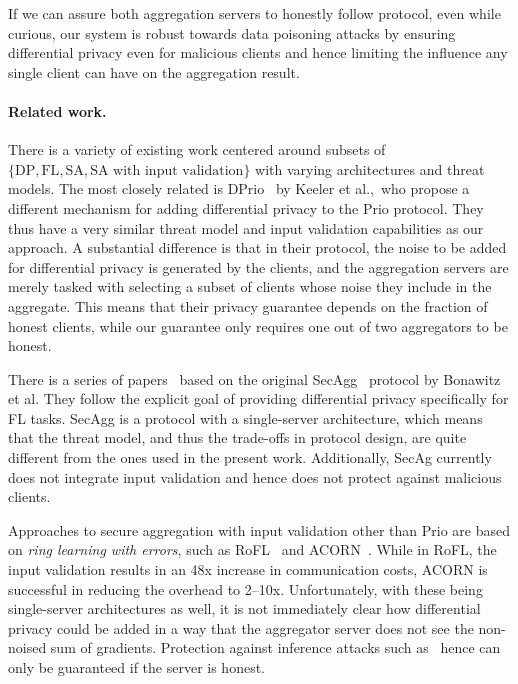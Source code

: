 \documentclass{article}
\begin{document}
If we can assure both aggregation servers to honestly follow protocol, even while curious, our system is robust towards data poisoning attacks by ensuring differential privacy even for malicious clients and hence limiting the influence any single client can have on the aggregation result.

\paragraph{Related work.}
There is a variety of existing work centered around subsets of
$\{\textrm{DP}, \textrm{FL}, \textrm{SA}, \textrm{SA with input validation}\}$ with varying
architectures and threat models. The most closely related is
DPrio~\cite{dprio} by Keeler et al.,\ who propose a different mechanism for
adding differential privacy to the Prio protocol. They thus have a very similar
threat model and input validation capabilities as our approach. A substantial
difference is that in their protocol, the noise to be added for differential
privacy is generated by the clients, and the aggregation servers are merely
tasked with selecting a subset of clients whose noise they include in the
aggregate. This means that their privacy guarantee depends on the fraction of
honest clients, while our guarantee only requires one out of two aggregators to
be honest.

There is a series of
papers~\cite{SecAggImprovement,Kairouz2021TheDD,SecAggSkellam,SecAggFundamental}
based on the original SecAgg~\cite{secagg} protocol by Bonawitz et al. They
follow the explicit goal of providing differential privacy specifically for FL
tasks. SecAgg is a protocol with a single-server architecture, which means that
the threat model, and thus the trade-offs in protocol design, are quite
different from the ones used in the present work. Additionally, SecAg currently
does not integrate input validation and hence does not protect against malicious
clients.

Approaches to secure aggregation with input validation other than Prio are based on
\textit{ring learning with errors}, such as RoFL~\cite{rofl} and ACORN~\cite{acorn}.
While in RoFL, the input validation results in an 48x increase in communication
costs, ACORN is successful in reducing the overhead to 2--10x. Unfortunately,
with these being single-server architectures as well, it is not immediately
clear how differential privacy could be added in a way that the aggregator
server does not see the non-noised sum of gradients. Protection against inference
attacks such as~\cite{7958568} hence can only be guaranteed if the server is honest.
\end{document}
